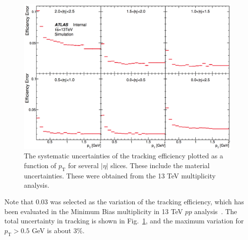 \begin{figure}[H]
\centering
\includegraphics[width=.9\linewidth]{figs/sec_sys/sys_tracking_error.png}
\caption{The systematic uncertainties of the tracking efficiency plotted as a function of $p_\text{T}$ for several $|\eta|$ slices. These include the material uncertainties. These were obtained from the 13 TeV multiplicity analysis.~\cite{Morley:2011604}}
\label{fig:sys_tracking_error}
\end{figure}
Note that $0.03$ was selected as the variation of the tracking efficiency, which has been evaluated in the Minimum Bias multiplicity in 13 TeV $pp$ analysis~\cite{Morley:2011604}. The total uncertainty in tracking is shown in Fig.~\ref{fig:sys_tracking_error}, and the maximum variation for $p_\text{T}>0.5$ GeV is about $3\%$.

